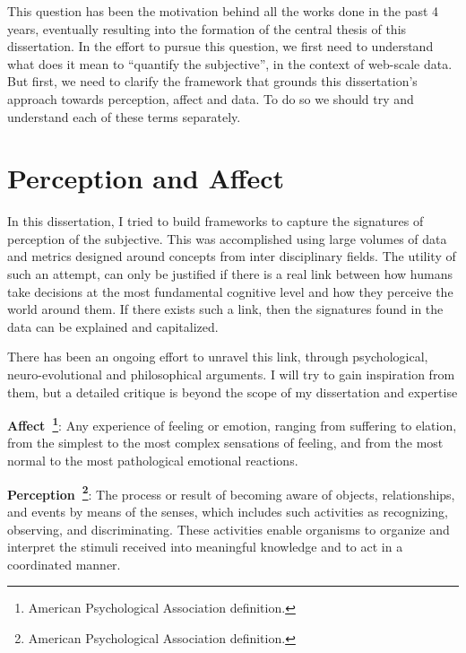 \vspace{1cm}

This question has been the motivation behind all the works done in the past 4 years, eventually resulting into the formation of the central thesis of this dissertation. 
In the effort to pursue this question, we first need to understand what does it mean to ``quantify the subjective'', in the context of web-scale data.
But first, we need to clarify the framework that grounds this dissertation's approach towards perception, affect and data. To do so we should try and understand each of these terms separately. 


\section{Perception and Affect}
In this dissertation, I tried to build frameworks to capture the signatures of perception of the subjective. This was accomplished using large volumes of data and metrics designed around concepts from inter disciplinary fields. The utility of such an attempt, can only be justified if there is a real link between how humans take decisions at the most fundamental cognitive level and how they perceive the world around them. If there exists such a link, then the signatures found in the data can be explained and capitalized. 

There has been an ongoing effort to unravel this link, through psychological, neuro-evolutional and philosophical arguments. I will try to gain inspiration from them, but a detailed critique is beyond the scope of my dissertation and expertise\\
\begin{definition}
    \textbf{Affect~\footnote{American Psychological Association definition.}}: Any experience of feeling or emotion, ranging from suffering to elation, from the simplest to the most complex sensations of feeling, and from the most normal to the most pathological emotional reactions.\\
\end{definition}


\begin{definition}
    \textbf{Perception~\footnote{American Psychological Association definition.}}: The process or result of becoming aware of objects, relationships, and events by means of the senses, which includes such activities as recognizing, observing, and discriminating. These activities enable organisms to organize and interpret the stimuli received into meaningful knowledge and to act in a coordinated manner.
\end{definition}


